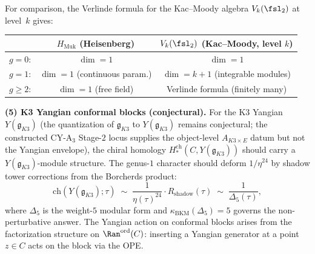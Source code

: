 For comparison, the Verlinde formula for the Kac--Moody algebra $V_k(\fsl_2)$ at level~$k$ gives:
\begin{center}
\begin{tabular}{l|c|c}
 & $H_{\mathrm{Muk}}$ (Heisenberg) & $V_k(\fsl_2)$ (Kac--Moody, level $k$) \\
\hline
$g = 0$: & $\dim = 1$ & $\dim = 1$ \\
$g = 1$: & $\dim = 1$ (continuous param.) & $\dim = k+1$ (integrable modules) \\
$g \geq 2$: & $\dim = 1$ (free field) & Verlinde formula (finitely many)
\end{tabular}
\end{center}

\medskip
\noindent\textbf{(5) K3 Yangian conformal blocks (conjectural).}
For the K3 Yangian $Y(\mathfrak{g}_{K3})$ (the quantization of $\mathfrak{g}_{K3}$ to $Y(\mathfrak{g}_{K3})$ remains conjectural; the constructed CY-A$_3$ Stage-$2$ locus supplies the object-level $A_{K3 \times E}$ datum but not the Yangian envelope), the chiral homology $H_*^{\mathrm{ch}}(C, Y(\mathfrak{g}_{K3}))$ should carry a $Y(\mathfrak{g}_{K3})$-module structure. The genus-$1$ character should deform $1/\eta^{24}$ by shadow tower corrections from the Borcherds product:
\[
 \mathrm{ch}(Y(\mathfrak{g}_{K3}); \tau)
 \;\sim\;
 \frac{1}{\eta(\tau)^{24}} \cdot R_{\mathrm{shadow}}(\tau)
 \;\sim\;
 \frac{1}{\Delta_5(\tau)},
\]
where $\Delta_5$ is the weight-$5$ modular form and $\kappa_{\mathrm{BKM}}(\Delta_5) = 5$ governs the non-perturbative answer. The Yangian action on conformal blocks arises from the factorization structure on $\Ran^{\mathrm{ord}}(C)$: inserting a Yangian generator at a point $z \in C$ acts on the block via the OPE.

